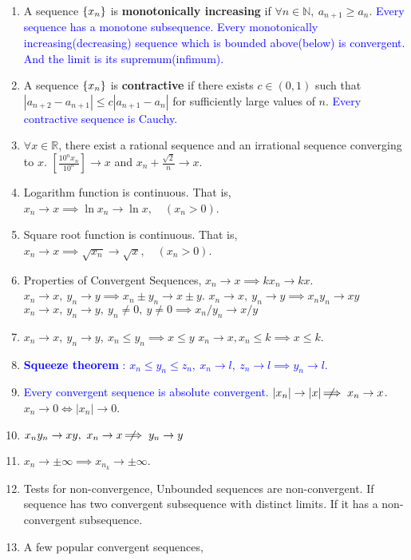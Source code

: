 \begin{enumerate}
	\item A sequence $\{x_n\}$ is \textbf{monotonically increasing} if $\forall n \in \mathbb{N},\ a_{n+1} \ge a_n$.
		\subitem \textcolor{blue}{Every sequence has a monotone subsequence.}
		\subitem \textcolor{blue}{Every monotonically increasing(decreasing) sequence which is bounded above(below) is convergent. And the limit is its supremum(infimum).}
	\item A sequence $\{x_n\}$ is \textbf{contractive} if there exists $c \in (0,1)$ such that $|a_{n+2}-a_{n+1}| \le c|a_{n+1}-a_n|$ for sufficiently large values of $n$.
		\subitem \textcolor{blue}{Every contractive sequence is Cauchy.}
	\item $\forall x \in \mathbb{R}$, there exist a rational sequence and an irrational sequence converging to $x$.
		$\left[ \frac{10^n x_n}{10^n} \right] \to x$ and $ x_n + \frac{\sqrt{2}}{n} \to x$.
	\item Logarithm function is continuous.
		That is, $x_n \to x \implies \ln{x_n} \to \ln{x}, \quad (x_n > 0)$.
	\item Square root function is continuous.
		That is, $x_n \to x \implies \sqrt{x_n} \to \sqrt{x}, \quad (x_n > 0)$.
	\item Properties of Convergent Sequences,
		\subitem $x_n \to x \implies kx_n \to kx$.
		\subitem $x_n \to x,\ y_n \to y \implies x_n \pm y_n \to x \pm y$.
		\subitem $x_n \to x,\ y_n \to y \implies x_n y_n \to xy$
		\subitem $x_n \to x,\ y_n \to y,\ y_n \ne 0,\ y \ne 0 \implies x_n/y_n \to x/y$ 
	\item $x_n \to x,\ y_n \to y,\ x_n \le y_n \implies x \le y$
		\subitem $x_n \to x, x_n \le k \implies x \le k$.
	\item \textcolor{blue}{\textbf{Squeeze theorem} : $x_n \le y_n \le z_n,\ x_n \to l,\ z_n \to l \implies y_n \to l$.}
	\item \textcolor{blue}{Every convergent sequence is absolute convergent.}
	\subitem $|x_n| \to |x| \;\not\nobreak\!\!\!\!\implies x_n \to x$.
	\subitem $x_n \to 0 \iff |x_n| \to 0$.
	\item $x_ny_n \to xy, \ x_n \to x \;\not\nobreak\!\!\!\!\implies y_n \to y$
	\item $x_n \to \pm \infty \implies x_{n_k} \to \pm \infty$.
	\item Tests for non-convergence,
		\subitem Unbounded sequences are non-convergent.
		\subitem If sequence has two convergent subsequence with distinct limits.
		\subitem If it has a non-convergent subsequence.
	\item A few popular convergent sequences,

\end{enumerate}
